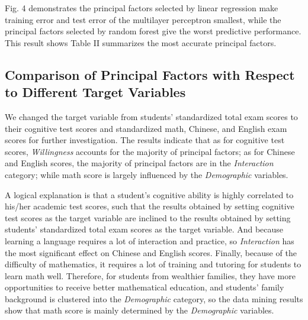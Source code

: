 \documentclass[conference]{IEEEtran}
\begin{document}
Fig. 4 demonstrates the principal factors selected by linear regression make training error and test error of the multilayer perceptron smallest, while the principal factors selected by random forest give the worst predictive performance. This result shows Table II summarizes the most accurate principal factors.

\subsection{Comparison of Principal Factors with Respect to Different Target Variables}
We changed the target variable from students' standardized total exam scores to their cognitive test scores and standardized math, Chinese, and English exam scores for further investigation. The results indicate that as for cognitive test scores, \textit{Willingness} accounts for the majority of principal factors; as for Chinese and English scores, the majority of principal factors are in the \textit{Interaction} category; while math score is largely influenced by the \textit{Demographic} variables. 

A logical explanation is that a student's cognitive ability is highly correlated to his/her academic test scores, such that the results obtained by setting cognitive test scores as the target variable are inclined to the results obtained by setting students' standardized total exam scores as the target variable. And because learning a language requires a lot of interaction and practice, so \textit{Interaction} has the most significant effect on Chinese and English scores. Finally, because of the difficulty of mathematics, it requires a lot of training and tutoring for students to learn math well. Therefore, for students from wealthier families, they have more opportunities to receive better mathematical education, and students' family background is clustered into the \textit{Demographic} category, so the data mining results show that math score is mainly determined by the \textit{Demographic} variables. 
\end{document}

